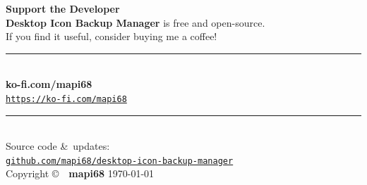 \documentclass[a4paper,11pt]{article}
\begin{document}
\begin{center}

  \begin{tcolorbox}[
      enhanced,
      colback=orange!6!white,
      colframe=orange!70!red,
      width=0.78\textwidth,
      arc=6mm,
      boxrule=1.5pt,
      drop shadow={black!30!white},
      left=20pt, right=20pt, top=20pt, bottom=20pt
    ]
    \centering

    {\large\color{orange!80!red}\faHeart\quad\textbf{Support the
    Developer}\quad\faHeart}\\[0.6cm]

    {\normalsize\color{gray}
      \textbf{Desktop Icon Backup Manager} is free and open-source.\\[0.2cm]
      If you find it useful, consider buying me a coffee!\\[0.5cm]
    }

    {\color{orange!70!black}\rule{0.6\textwidth}{0.4pt}}\\[0.5cm]

    {\Large\color{orange!80!red}\faCoffee\quad
    \textbf{ko-fi.com/mapi68}}\\[0.3cm]

    {\small\color{blue!60}%
      \href{https://ko-fi.com/mapi68}{%
        \texttt{https://ko-fi.com/mapi68}%
      }%
    }\\[0.6cm]

    {\color{orange!70!black}\rule{0.6\textwidth}{0.4pt}}\\[0.5cm]

    {\small\color{gray}
      Source code \&\ updates:\\[0.1cm]
    }
    {\small\color{blue!60}%
      \href{https://github.com/mapi68/desktop-icon-backup-manager}{%
        \faGithub\quad\texttt{github.com/mapi68/desktop-icon-backup-manager}%
      }%
    }\\[0.6cm]

    {\footnotesize\color{gray}Copyright
    \copyright\ \the\year\ \textbf{mapi68} \quad\textbullet\quad \today}

  \end{tcolorbox}

\end{center}

\vspace*{\fill}
\end{document}

